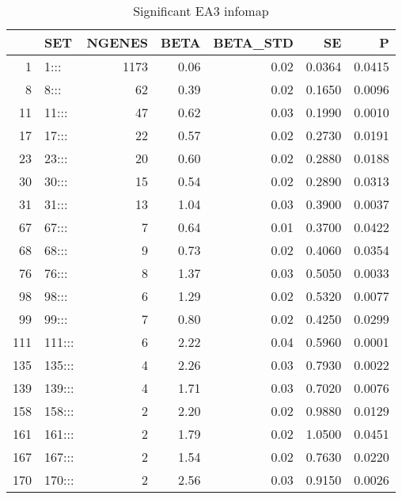 \begin{table}[ht]
\centering
\begin{tabular}{rlrrrrr}
  \hline
 & SET & NGENES & BETA & BETA\_STD & SE & P \\ 
  \hline
1 & 1::: & 1173 & 0.06 & 0.02 & 0.0364 & 0.0415 \\ 
  8 & 8::: & 62 & 0.39 & 0.02 & 0.1650 & 0.0096 \\ 
  11 & 11::: & 47 & 0.62 & 0.03 & 0.1990 & 0.0010 \\ 
  17 & 17::: & 22 & 0.57 & 0.02 & 0.2730 & 0.0191 \\ 
  23 & 23::: & 20 & 0.60 & 0.02 & 0.2880 & 0.0188 \\ 
  30 & 30::: & 15 & 0.54 & 0.02 & 0.2890 & 0.0313 \\ 
  31 & 31::: & 13 & 1.04 & 0.03 & 0.3900 & 0.0037 \\ 
  67 & 67::: &  7 & 0.64 & 0.01 & 0.3700 & 0.0422 \\ 
  68 & 68::: &  9 & 0.73 & 0.02 & 0.4060 & 0.0354 \\ 
  76 & 76::: &  8 & 1.37 & 0.03 & 0.5050 & 0.0033 \\ 
  98 & 98::: &  6 & 1.29 & 0.02 & 0.5320 & 0.0077 \\ 
  99 & 99::: &  7 & 0.80 & 0.02 & 0.4250 & 0.0299 \\ 
  111 & 111::: &  6 & 2.22 & 0.04 & 0.5960 & 0.0001 \\ 
  135 & 135::: &  4 & 2.26 & 0.03 & 0.7930 & 0.0022 \\ 
  139 & 139::: &  4 & 1.71 & 0.03 & 0.7020 & 0.0076 \\ 
  158 & 158::: &  2 & 2.20 & 0.02 & 0.9880 & 0.0129 \\ 
  161 & 161::: &  2 & 1.79 & 0.02 & 1.0500 & 0.0451 \\ 
  167 & 167::: &  2 & 1.54 & 0.02 & 0.7630 & 0.0220 \\ 
  170 & 170::: &  2 & 2.56 & 0.03 & 0.9150 & 0.0026 \\ 
   \hline
\end{tabular}
\caption{Significant EA3 infomap}
\label{tab:infomap EA3}
\end{table}


